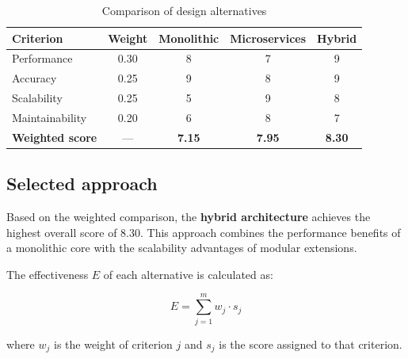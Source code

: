 \begin{table}[H]
    \caption{Comparison of design alternatives} \label{tab:alternatives}
    \begin{tabular}{|l|c|c|c|c|}
    \hline \textbf{Criterion} & \textbf{Weight} & \textbf{Monolithic} & \textbf{Microservices} & \textbf{Hybrid} \\
    \hline Performance  & 0.30 & 8 & 7 & 9 \\
    \hline Accuracy     & 0.25 & 9 & 8 & 9 \\
    \hline Scalability  & 0.25 & 5 & 9 & 8 \\
    \hline Maintainability & 0.20 & 6 & 8 & 7 \\
    \hline \textbf{Weighted score} & --- & \textbf{7.15} & \textbf{7.95} & \textbf{8.30} \\
    \hline
    \end{tabular}
\end{table}

\subsection{Selected approach}

Based on the weighted comparison, the \textbf{hybrid architecture} achieves the highest overall score of 8.30.
This approach combines the performance benefits of a monolithic core with the scalability advantages of modular extensions.

The effectiveness $E$ of each alternative is calculated as:

\begin{equation} \label{eq:weighted}
    E = \sum_{j=1}^{m} w_j \cdot s_j
\end{equation}

where $w_j$ is the weight of criterion $j$ and $s_j$ is the score assigned to that criterion.

\clearpage
